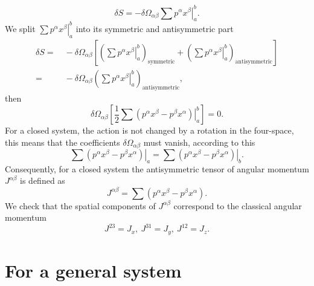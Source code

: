 \begin{appendix}
\[
\delta S=-\delta\Omega_{\alpha\beta}\sum\left.p^{\alpha}x^{\beta}\right|_{a}^{b}.
\]
We split $\sum\left.p^{\alpha}x^{\beta}\right|_{a}^{b}$ into its
symmetric and antisymmetric part
\begin{align*}
\delta S= & \ -\delta\Omega_{\alpha\beta}\left[\left(\sum\left.p^{\alpha}x^{\beta}\right|_{a}^{b}\right)_{\text{symmetric}}+\left(\sum\left.p^{\alpha}x^{\beta}\right|_{a}^{b}\right)_{\text{antisymmetric}}\right]\\
= & \ -\delta\Omega_{\alpha\beta}\left(\sum\left.p^{\alpha}x^{\beta}\right|_{a}^{b}\right)_{\text{antisymmetric}},
\end{align*}
then
\[
\delta\Omega_{\alpha\beta}\left[\frac{1}{2}\sum\left.\left(p^{\alpha}x^{\beta}-p^{\beta}x^{\alpha}\right)\right|_{a}^{b}\right]=0.
\]
For a closed system, the action is not changed by a rotation in the
four-space, this means that the coefficients $\delta\Omega_{\alpha\beta}$
must vanish, according to this
\[
\sum\left.\left(p^{\alpha}x^{\beta}-p^{\beta}x^{\alpha}\right)\right|_{a}=\sum\left.\left(p^{\alpha}x^{\beta}-p^{\beta}x^{\alpha}\right)\right|_{b}.
\]
Consequently, for a closed system the antisymmetric tensor of angular
momentum $J^{\alpha\beta}$ is defined as
\[
J^{\alpha\beta}=\sum\left(p^{\alpha}x^{\beta}-p^{\beta}x^{\alpha}\right).
\]
We check that the spatial components of $J^{\alpha\beta}$ correspond
to the classical angular momentum
\[
J^{23}=J_{x},\ J^{31}=J_{y},\ J^{12}=J_{z}.
\]

\section{For a general system}


\end{appendix}

